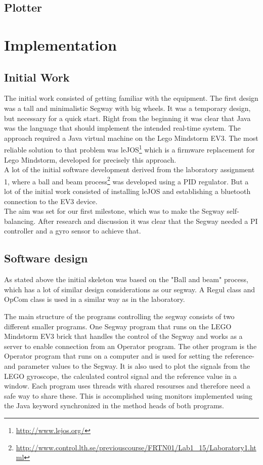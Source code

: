 \subsection{Plotter}
  
\section{Implementation}
\subsection{Initial Work}
The initial work consisted of getting familiar with the equipment. The first design was a tall and minimalistic Segway with big wheels. It was a temporary design, but necessary for a quick start. Right from the beginning it was clear that Java was the language that should implement the intended real-time system. The approach required a Java virtual machine on the Lego Mindstorm EV3. The most reliable solution to that problem was leJOS\footnote{\url{http://www.lejos.org/}} which is a firmware replacement for Lego Mindstorm, developed for precisely this approach. 
\\[3ex]
A lot of the initial software development derived from the laboratory assignment 1, where a ball and beam process\footnote{\url{http://www.control.lth.se/previouscourse/FRTN01/Lab1_15/Laboratory1.html}} was developed using a PID regulator. But a lot of the initial work consisted of installing leJOS and establishing a bluetooth connection to the EV3 device. 
\\[3ex]
The aim was set for our first milestone, which was to make the Segway self-balancing. After research and discussion it was clear that the Segway needed a PI controller and a gyro sensor to achieve that. 

\subsection{Software design}

As stated above the initial skeleton was based on the "Ball and beam" process, which has a lot of similar design considerations as our segway. A Regul class and OpCom class is used in a similar way as in the laboratory.

The main structure of the programs controlling the segway consists of two different smaller programs. One Segway program that runs on the LEGO Mindstorm EV3 brick that handles the control of the Segway and works as a server to enable connection from an Operator program. The other program is the Operator program that runs on a computer and is used for setting the reference- and parameter values to the Segway. It is also used to plot the signals from the LEGO gyroscope, the calculated control signal and the reference value in a window. Each program uses threads with shared resourses and therefore need a safe way to share these. This is accomplished using monitors implemented using the Java keyword synchronized in the method heads of both programs.


